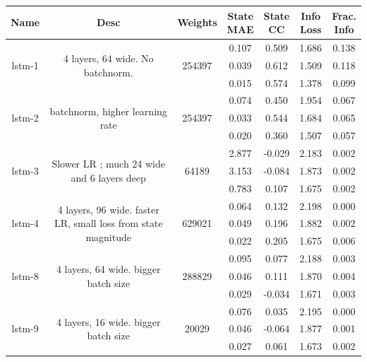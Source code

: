\begin{table}[h!p]
    \footnotesize
    \centering
\begin{sideways}
    \begin{tabular}{c|c|c|c|c|c|c }
Name & Desc & Weights & \thead{State\\MAE} & \thead{State\\CC} & \thead{Info\\Loss} &\thead{Frac.\\Info}\\
\hline
\multirow{3}{6em}{lstm-1} & \multirow{3}{16em}{4 layers, 64 wide. No batchnorm. } & \multirow{3}{4em}{254397} & 0.107 & 0.509 & 1.686 & 0.138 \\ & & & 0.039 & 0.612 & 1.509 & 0.118 \\ & & & 0.015 & 0.574 & 1.378 & 0.099 \\
\hline
\multirow{3}{6em}{lstm-2} & \multirow{3}{16em}{batchnorm, higher learning rate} & \multirow{3}{4em}{254397} & 0.074 & 0.450 & 1.954 & 0.067 \\ & & & 0.033 & 0.544 & 1.684 & 0.065 \\ & & & 0.020 & 0.360 & 1.507 & 0.057 \\
\hline
\multirow{3}{6em}{lstm-3} & \multirow{3}{16em}{Slower LR ; much 24 wide and 6 layers deep} & \multirow{3}{4em}{64189} & 2.877 & -0.029 & 2.183 & 0.002 \\ & & & 3.153 & -0.084 & 1.873 & 0.002 \\ & & & 0.783 & 0.107 & 1.675 & 0.002 \\
\hline
\multirow{3}{6em}{lstm-4} & \multirow{3}{16em}{4 layers, 96 wide. faster LR, small loss from state magnitude} & \multirow{3}{4em}{629021} & 0.064 & 0.132 & 2.198 & 0.000 \\ & & & 0.049 & 0.196 & 1.882 & 0.002 \\ & & & 0.022 & 0.205 & 1.675 & 0.006 \\
\hline
\multirow{3}{6em}{lstm-8} & \multirow{3}{16em}{4 layers, 64 wide. bigger batch size} & \multirow{3}{4em}{288829} & 0.095 & 0.077 & 2.188 & 0.003 \\ & & & 0.046 & 0.111 & 1.870 & 0.004 \\ & & & 0.029 & -0.034 & 1.671 & 0.003 \\
\hline
\multirow{3}{6em}{lstm-9} & \multirow{3}{16em}{4 layers, 16 wide. bigger batch size} & \multirow{3}{4em}{20029} & 0.076 & 0.035 & 2.195 & 0.000 \\ & & & 0.046 & -0.064 & 1.877 & 0.001 \\ & & & 0.027 & 0.061 & 1.673 & 0.002 \\

\end{tabular}
\end{sideways}
\end{table}
